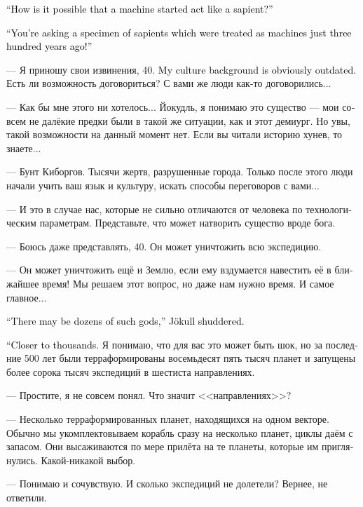 \documentclass[a4paper,12pt,fleqn]{book}\usepackage{cooltooltips}\usepackage{polyglossia}\setdefaultlanguage[babelshorthands=true]{russian}\setotherlanguage{english}\defaultfontfeatures{Ligatures=TeX,Mapping=tex-text} \usepackage{xcolor}\definecolor{lightgray}{HTML}{bbbbbb}\color{lightgray}\newcommand{\ml}[3]{\textenglish{\textcolor{black}{#3}}}
\begin{document}
\ml{$0$}
{--- Как вообще могло получиться, что машина начала вести себя как разумное существо?}
{``How is it possible that a machine started act like a sapient?''}

\ml{$0$}
{--- Вы спрашиваете у существа, которое ещё триста лет назад считали машиной!}
{``You're asking a specimen of sapients which were treated as machines just three hundred years ago!''}

--- Я приношу свои извинения, 40.
\ml{$0$}
{Мой культурный код явно устарел.}
{My culture background is obviously outdated.}
Есть ли возможность договориться?
С вами же люди как-то договорились...

--- Как бы мне этого ни хотелось...
Йокудль, я понимаю это существо --- мои совсем не далёкие предки были в такой же ситуации, как и этот демиург.
Но увы, такой возможности на данный момент нет.
Если вы читали историю хунев, то знаете...

--- Бунт Киборгов.
Тысячи жертв, разрушенные города.
Только после этого люди начали учить ваш язык и культуру, искать способы переговоров с вами...

--- И это в случае нас, которые не сильно отличаются от человека по технологическим параметрам.
Представьте, что может натворить существо вроде бога.

--- Боюсь даже представлять, 40.
Он может уничтожить всю экспедицию.

--- Он может уничтожить ещё и Землю, если ему вздумается навестить её в ближайшее время!
Мы решаем этот вопрос, но даже нам нужно время.
И самое главное...

\ml{$0$}
{--- Таких богов могут быть десятки, --- Йокудль вздрогнул.}
{``There may be dozens of such gods,'' Jökull shuddered.}

\ml{$0$}
{--- Ближе к тысячам.}
{``Closer to thousands.}
Я понимаю, что для вас это может быть шок, но за последние 500 лет были терраформированы восемьдесят пять тысяч планет и запущены более сорока тысяч экспедиций в шестиста направлениях.

--- Простите, я не совсем понял.
Что значит <<направлениях>>?

--- Несколько терраформированных планет, находящихся на одном векторе.
Обычно мы укомплектовываем корабль сразу на несколько планет, циклы даём с запасом.
Они высаживаются по мере прилёта на те планеты, которые им приглянулись.
Какой-никакой выбор.

--- Понимаю и сочувствую.
И сколько экспедиций не долетели?
Вернее, не ответили.
\end{document}
